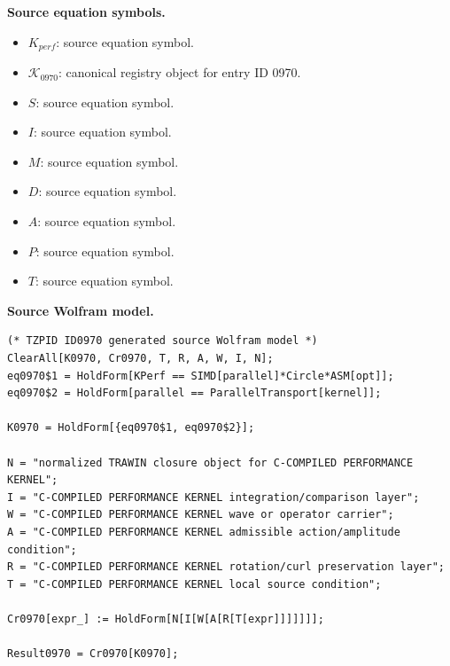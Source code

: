 \begin{minipage}[t]{0.49\linewidth}
\begingroup
\small
\raggedright
\textbf{Source equation symbols.}\par
\begin{itemize}[leftmargin=1.35em,itemsep=1pt,topsep=1pt,parsep=0pt]
    \item $K_{perf}$: source equation symbol.
    \item $\mathcal{K}_{0970}$: canonical registry object for entry ID 0970.
    \item $S$: source equation symbol.
    \item $I$: source equation symbol.
    \item $M$: source equation symbol.
    \item $D$: source equation symbol.
    \item $A$: source equation symbol.
    \item $P$: source equation symbol.
    \item $T$: source equation symbol.
\end{itemize}
\endgroup
\end{minipage}\hfill
\begin{minipage}[t]{0.47\linewidth}
\begingroup
\scriptsize
\raggedright
\textbf{Source Wolfram model.}\par
\begin{Verbatim}[fontsize=\tiny,breaklines=true,breakanywhere=true]
(* TZPID ID0970 generated source Wolfram model *)
ClearAll[K0970, Cr0970, T, R, A, W, I, N];
eq0970$1 = HoldForm[KPerf == SIMD[parallel]*Circle*ASM[opt]];
eq0970$2 = HoldForm[parallel == ParallelTransport[kernel]];

K0970 = HoldForm[{eq0970$1, eq0970$2}];

N = "normalized TRAWIN closure object for C-COMPILED PERFORMANCE KERNEL";
I = "C-COMPILED PERFORMANCE KERNEL integration/comparison layer";
W = "C-COMPILED PERFORMANCE KERNEL wave or operator carrier";
A = "C-COMPILED PERFORMANCE KERNEL admissible action/amplitude condition";
R = "C-COMPILED PERFORMANCE KERNEL rotation/curl preservation layer";
T = "C-COMPILED PERFORMANCE KERNEL local source condition";

Cr0970[expr_] := HoldForm[N[I[W[A[R[T[expr]]]]]]];

Result0970 = Cr0970[K0970];
\end{Verbatim}
\endgroup
\end{minipage}

